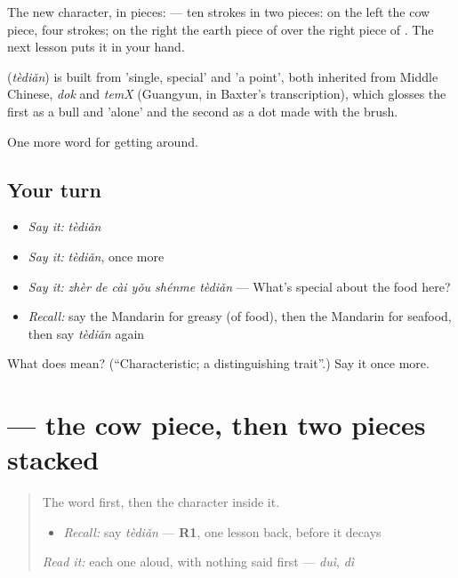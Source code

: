The new character, in pieces:  — ten strokes in two pieces: on the left the cow piece, four strokes; on the right the earth piece of  over the right piece of . The next lesson puts it in your hand.

\begin{cousinweb}
\textbf{} (\emph{tèdiǎn}) is built from  'single, special' and  'a point', both inherited from Middle Chinese, \emph{dok} and \emph{temX} (Guangyun, in Baxter's transcription), which glosses the first as a bull and 'alone' and the second as a dot made with the brush.
\end{cousinweb}

\begin{grammarlens}[title={What you've built}]
One more word for getting around.
\end{grammarlens}

\subsection*{Your turn}
\begin{itemize}
\raggedright
  \item \emph{Say it:} \emph{tèdiǎn}
  \item \emph{Say it:} \emph{tèdiǎn}, once more
  \item \emph{Say it:} \emph{zhèr de cài yǒu shénme tèdiǎn} — What's special about the food here?
  \item \emph{Recall:} say the Mandarin for greasy (of food), then the Mandarin for seafood, then say \emph{tèdiǎn} again
\end{itemize}

\begin{tcolorbox}[breakable,colback=teal!4,colframe=teal!35!black,title={Before you move on}]
What does  mean? (\textquotedblleft{}Characteristic; a distinguishing trait\textquotedblright{}.) Say it once more.
\end{tcolorbox}
\section[\texorpdfstring{\zh{特} (tè)}{特 (tè)}]{ — the cow piece, then two pieces stacked}

\label{lesson:ZH-W450-te-special}



\begin{quote}
The word first, then the character inside it.

\begin{itemize}
\raggedright
  \item \emph{Recall:} say \emph{tèdiǎn} — \textbf{R1}, one lesson back, before it decays
\end{itemize}

\begin{quote}
 
\end{quote}

\emph{Read it:} each one aloud, with nothing said first — \emph{duì}, \emph{dì}
\end{quote}

